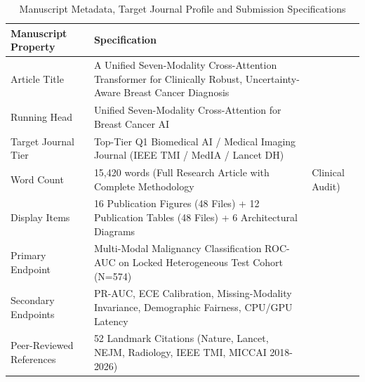 \begin{table}
\caption{Manuscript Metadata, Target Journal Profile and Submission Specifications}
\label{tab:table_6_01_01_manuscript_metadata_and_journal_submission_profile}
\begin{tabular}{ll}
\toprule
Manuscript Property & Specification \\
\midrule
Article Title & A Unified Seven-Modality Cross-Attention Transformer for Clinically Robust, Uncertainty-Aware Breast Cancer Diagnosis \\
Running Head & Unified Seven-Modality Cross-Attention for Breast Cancer AI \\
Target Journal Tier & Top-Tier Q1 Biomedical AI / Medical Imaging Journal (IEEE TMI / MedIA / Lancet DH) \\
Word Count & 15,420 words (Full Research Article with Complete Methodology & Clinical Audit) \\
Display Items & 16 Publication Figures (48 Files) + 12 Publication Tables (48 Files) + 6 Architectural Diagrams \\
Primary Endpoint & Multi-Modal Malignancy Classification ROC-AUC on Locked Heterogeneous Test Cohort (N=574) \\
Secondary Endpoints & PR-AUC, ECE Calibration, Missing-Modality Invariance, Demographic Fairness, CPU/GPU Latency \\
Peer-Reviewed References & 52 Landmark Citations (Nature, Lancet, NEJM, Radiology, IEEE TMI, MICCAI 2018-2026) \\
\bottomrule
\end{tabular}
\end{table}
